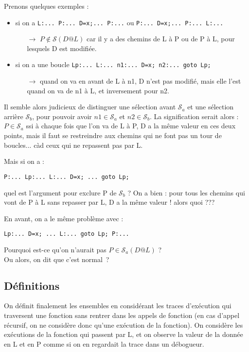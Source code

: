\documentclass[a4paper,twoside]{article}
\renewcommand{\sc}{\mathcal{S}}
\newcommand{\sca}{\mathcal{S}_a}
\newcommand{\scb}{\mathcal{S}_b}
\begin{document}
Prenons quelques exemples :

\begin{itemize}
  \item si on a \verb!L:... P:... D=x;... P:...!
     ou \verb!P:... D=x;... P:... L:...!
     \begin{itemize}\item[$\rightarrow$]
   $P \notin \sc(D@L)$
   car il y a des chemins de L à P ou de P à L, pour lesquels D est modifiée.
     \end{itemize}

   \item si on a une boucle \verb!Lp:... L:... n1:... D=x; n2:... goto Lp;!
     \begin{itemize}\item[$\rightarrow$]
	   quand on va en avant de L à n1, D n'est pas modifié,
	   mais elle l'est quand on va de n1 à L, et inversement pour n2.
     \end{itemize}
\end{itemize}

Il semble alors judicieux de distinguer une sélection avant $\sca$
et une sélection arrière $\scb$, pour pouvoir avoir $n1 \in \sca$ et $n2 \in \scb$.
La signification serait alors :
$P \in \sca$ ssi à chaque fois que l'on va de L à P,
D a la même valeur en ces deux points,
mais il faut se restreindre aux chemins qui ne font pas un tour de boucles...
càd ceux qui ne repassent pas par L.

Mais si on a :

\centerline{\verb!P:... Lp:... L:... D=x; ... goto Lp;!}

quel est l'argument pour exclure P de $\scb$ ?
On a bien : pour tous les chemins qui vont de P à L sans repasser par L,
  D a la même valeur ! alors quoi ???

En avant, on a le même problème avec :

\centerline{\verb!Lp:... D=x; ... L:... goto Lp; P:...!}

Pourquoi est-ce qu'on n'aurait pas $P \in \sca(D@L)$ ?\\

Ou alors, on dit que c'est normal~?

\subsection{Définitions}

On définit finalement les ensembles en considérant les traces d'exécution
qui traversent une fonction
sans rentrer dans les appels de fonction (en cas d'appel récursif, on ne
considère donc qu'une exécution de la fonction).
On considère les exécutions de la fonction
qui passent par L, et on observe la valeur de la donnée en L et en P
comme si on en regardait la trace dans un débogueur.
\end{document}
